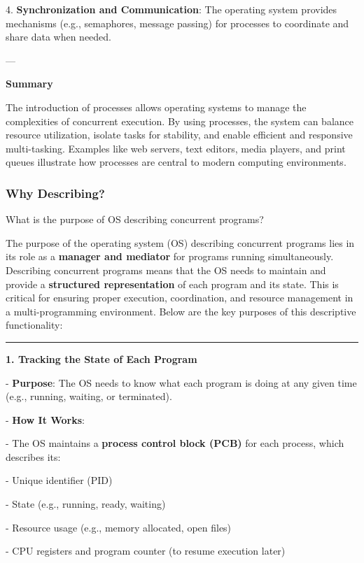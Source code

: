 \documentclass[a4paper]{book}
\begin{document}
4. \textbf{Synchronization and Communication}: The operating system provides mechanisms (e.g., semaphores, message passing) for processes to coordinate and share data when needed.

---

\textbf{Summary}

The introduction of processes allows operating systems to manage the complexities of concurrent execution. By using processes, the system can balance resource utilization, isolate tasks for stability, and enable efficient and responsive multi-tasking. Examples like web servers, text editors, media players, and print queues illustrate how processes are central to modern computing environments.

\subsubsection{Why Describing?}

\begin{greenbox}
What is the purpose of OS describing concurrent programs?
\end{greenbox}

The purpose of the operating system (OS) describing concurrent programs lies in its role as a \textbf{manager and mediator} for programs running simultaneously. Describing concurrent programs means that the OS needs to maintain and provide a \textbf{structured representation} of each program and its state. This is critical for ensuring proper execution, coordination, and resource management in a multi-programming environment. Below are the key purposes of this descriptive functionality:

\rule{0.75\textwidth}{0.5pt}

\textbf{1. Tracking the State of Each Program}

   - \textbf{Purpose}: The OS needs to know what each program is doing at any given time (e.g., running, waiting, or terminated).
   
   - \textbf{How It Works}:
   
     - The OS maintains a \textbf{process control block (PCB)} for each process, which describes its:
       
       - Unique identifier (PID)
       
       - State (e.g., running, ready, waiting)
       
       - Resource usage (e.g., memory allocated, open files)
       
       - CPU registers and program counter (to resume execution later)
   
\end{document}
